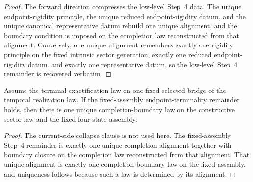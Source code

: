 \begin{proof}
The forward direction compresses the low-level Step~4 data. The unique
endpoint-rigidity principle, the unique reduced endpoint-rigidity datum, and
the unique canonical representative datum rebuild one unique alignment, and
the boundary condition is imposed on the completion law reconstructed from
that alignment. Conversely, one unique alignment remembers exactly one
rigidity principle on the fixed intrinsic sector generation, exactly one
reduced endpoint-rigidity datum, and exactly one representative datum, so the
low-level Step~4 remainder is recovered verbatim.
\end{proof}

\begin{theorem}
\label{thm:canonical-completion-boundary-law-target-of-canonical-law-native-step4-boundary-route-target}
Assume the terminal exactification law on one fixed selected bridge of the
temporal realization law. If the fixed-assembly endpoint-terminality remainder
holds, then there is one unique completion-boundary law on the constructive
sector law and the fixed four-state assembly.
\end{theorem}

\begin{proof}
The current-side collapse clause is not used here. The fixed-assembly Step~4
remainder is exactly one unique completion alignment together with boundary
closure on the completion law reconstructed from that alignment. That unique
alignment is exactly one completion-boundary law on the fixed assembly, and
uniqueness follows because such a law is determined by its alignment.
\end{proof}

